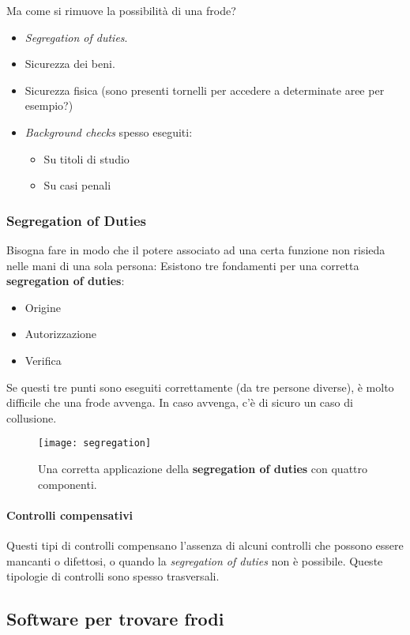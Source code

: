 Ma come si rimuove la possibilità di una frode?
\begin{itemize}
  \item \textit{Segregation of duties}.
  \item Sicurezza dei beni.
  \item Sicurezza fisica (sono presenti tornelli per accedere a determinate
aree per esempio?)
  \item \textit{Background checks} spesso eseguiti:
  \begin{itemize}
    \item Su titoli di studio
    \item Su casi penali
  \end{itemize}
\end{itemize}

\subsubsection{Segregation of Duties}

Bisogna fare in modo che il potere associato ad una certa funzione non risieda
nelle mani di una sola persona:
Esistono tre fondamenti per una corretta \textbf{segregation of duties}:
\begin{itemize}
  \item Origine
  \item Autorizzazione
  \item Verifica
\end{itemize}

Se questi tre punti sono eseguiti correttamente (da tre persone diverse), 
è molto difficile che una frode avvenga. 
In caso avvenga, c'è di sicuro un caso di collusione.

\begin{figure}[H]
 \centering
 \texttt{[image: segregation]}
 \caption{Una corretta applicazione della \textbf{segregation of duties} con 
quattro componenti.}
\end{figure}


\paragraph*{Controlli compensativi}

Questi tipi di controlli compensano l'assenza di alcuni controlli che possono
essere mancanti o difettosi, o quando la \textit{segregation of duties} non è
possibile. Queste tipologie di controlli sono spesso trasversali.

\subsection{Software per trovare frodi}

